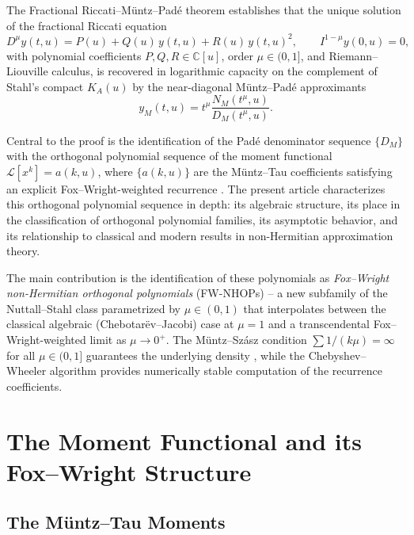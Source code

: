 \documentclass{article}
\newcommand{\C}{\mathbb{C}}
\begin{document}
The Fractional Riccati--Müntz--Padé theorem \cite{Crowley2026} establishes
that the unique solution of the fractional Riccati equation
\begin{equation}\label{eq:fRic}
  D^{\mu} y(t,u) = P(u) + Q(u)\,y(t,u) + R(u)\,y(t,u)^{2},
  \qquad I^{1-\mu}y(0,u) = 0,
\end{equation}
with polynomial coefficients $P, Q, R \in \C[u]$, order $\mu \in (0,1]$,
and Riemann--Liouville calculus, is recovered in logarithmic capacity on
the complement of Stahl's compact $K_A(u)$ by the near-diagonal
Müntz--Padé approximants
\begin{equation}\label{eq:yM}
  y_M(t,u) = t^\mu \frac{N_M(t^\mu, u)}{D_M(t^\mu, u)}.
\end{equation}

Central to the proof is the identification of the Padé denominator sequence
$\{D_M\}$ with the orthogonal polynomial sequence of the moment functional
$\mathcal{L}[x^k] = a(k,u)$, where $\{a(k,u)\}$ are the Müntz--Tau
coefficients satisfying an explicit Fox--Wright-weighted recurrence
\cite{Crowley2026}. The present article characterizes this orthogonal
polynomial sequence in depth: its algebraic structure, its place in the
classification of orthogonal polynomial families, its asymptotic behavior,
and its relationship to classical and modern results in non-Hermitian
approximation theory.

The main contribution is the identification of these polynomials as
\emph{Fox--Wright non-Hermitian orthogonal polynomials} (FW-NHOPs) --
a new subfamily of the Nuttall--Stahl class parametrized by $\mu \in (0,1)$
that interpolates between the classical algebraic (Chebotarëv--Jacobi)
case at $\mu = 1$ and a transcendental Fox--Wright-weighted limit as
$\mu \to 0^+$. The Müntz--Szász condition $\sum 1/(k\mu) = \infty$ for all
$\mu \in (0,1]$ guarantees the underlying density \cite{Moragues2018},
while the Chebyshev--Wheeler algorithm \cite{Wheeler1974} provides
numerically stable computation of the recurrence coefficients.

\section{The Moment Functional and its Fox--Wright Structure}

\subsection{The Müntz--Tau Moments}
\end{document}

